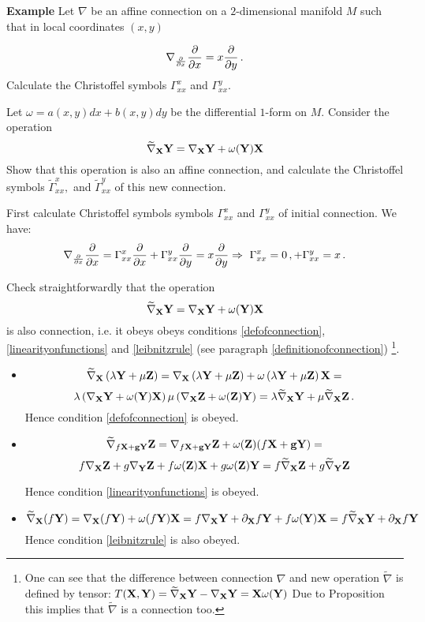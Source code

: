 \documentclass[12pt]{article}
\theoremstyle{theorem}
\numberwithin{equation}{section}
\begin{document}
\medskip

{\bf Example}   
Let $\nabla$ be an affine connection on a $2$-dimensional manifold 
	$M$ such that in local coordinates $(x,y)$

		       $$
          \nabla_{\partial\over \partial x}{\partial\over \partial x}=x{\partial\over \partial y}\,.
		       $$
	   Calculate the Christoffel symbols $\Gamma^x_{xx}$
		and $\Gamma^y_{xx}$.

	Let $\omega=a(x,y)dx+b(x,y)dy$ be the 
differential $1$-form on $M$.
  Consider the operation
              $$
\widetilde\nabla_{\bf X}{\bf Y}=\nabla_{\bf X}{\bf Y}+\omega ({\bf Y}){\bf X}
              $$
         Show that this operation is also
an affine connection, and calculate
 the Christoffel symbols 
 $\widetilde\Gamma^x_{xx},$
		and $\widetilde\Gamma^y_{xx}$ of this new connection.
		
First calculate Christoffel symbols 
	    symbols $\Gamma^x_{xx}$
		and $\Gamma^y_{xx}$ of initial connection. We have:
		 $$
\nabla_{\partial\over \partial x}{\partial\over \partial x}=
\Gamma_{xx}^x{\partial\over \partial x}+
\Gamma_{xx}^y{\partial\over \partial y}=
x{\partial\over \partial y}\Rightarrow \,\,
\Gamma_{xx}^x=0\,,+
\Gamma_{xx}^y=x\,.
		 $$


Check  straightforwardly that the operation
            $$
\widetilde\nabla_{\bf X}{\bf Y}=\nabla_{\bf X} {\bf Y}+\omega({\bf Y}){\bf X}
            $$
is also connection, i.e. it obeys
obeys conditions 
\eqref{defofconnection},
\eqref{linearityonfunctions}
and \eqref{leibnitzrule} (see paragraph \ref{definitionofconnection})
\footnote{One can see that the difference between connection $\nabla$
and new operation $\widetilde \nabla$
is defined by tensor:
    $T({\bf X},{\bf Y})=\widetilde \nabla_{\bf X}{\bf Y}-\nabla_{\bf X}{\bf Y}={\bf X}\omega ({\bf Y})$
Due to Proposition this implies that $\widetilde \nabla$ is a connection
too.
}.

\begin{itemize}
	\item
             $$
  \widetilde \nabla_{\bf X}\left(\lambda{\bf Y}+\mu{\bf Z}\right)=
  \nabla_{\bf X}\left(\lambda{\bf Y}+\mu{\bf Z}\right)+
 \omega\left(\lambda{\bf Y}+\mu{\bf Z}\right){\bf X}=
               $$
               $$
\lambda\left(\nabla_{\bf X}{\bf Y}+\omega({\bf Y}){\bf X}\right)
\mu\left(\nabla_{\bf X}{\bf Z}+\omega({\bf Z}){\bf Y}\right)=
\lambda\widetilde\nabla_{\bf X}{\bf Y}+
\mu\widetilde\nabla_{\bf X}{\bf Z}\,.
             $$
		Hence condition \eqref{defofconnection} is obeyed.

	\item
             $$
  \widetilde \nabla_{f\bf X+g{\bf Y}}{\bf Z}=
  \nabla_{f\bf X+g{\bf Y}}{\bf Z}+\omega({\bf Z})(f\bf X+g{\bf Y})=
        $$
        $$
      f\nabla_{\bf X}{\bf Z}+g\nabla_{\bf Y}{\bf Z}+
       f\omega({\bf Z}){\bf X}+g\omega({\bf Z}){\bf Y}=
      f\widetilde\nabla_{\bf X}{\bf Z}
      +g\widetilde\nabla_{\bf Y}{\bf Z}
              $$
              
		Hence condition 
		\eqref{linearityonfunctions} is obeyed.

	\item
             $$
  \widetilde \nabla_{\bf X} (f{\bf Y})=
   \nabla_{\bf X} (f{\bf Y})+\omega(f{\bf Y}){\bf X}=
   f\nabla_{\bf X}{\bf Y}+\partial_{\bf X} f{\bf Y}+f\omega({\bf Y}){\bf X}=
f\widetilde\nabla_{\bf X}{\bf Y}+\partial_{\bf X} f{\bf Y}  
        $$
		Hence condition \eqref{leibnitzrule} 
		is also obeyed.  
		
\end{itemize}	
		
\end{document}
